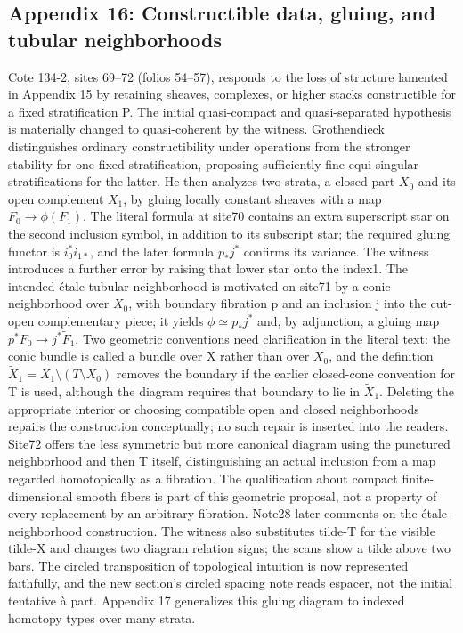\documentclass[10pt,oneside]{book}
\begin{document}
\subsection*{Appendix 16: Constructible data, gluing, and tubular neighborhoods}
Cote 134-2, sites 69--72 (folios 54--57), responds to the loss of structure lamented in Appendix 15 by retaining sheaves, complexes, or higher stacks constructible for a fixed stratification P. The initial quasi-compact and quasi-separated hypothesis is materially changed to quasi-coherent by the witness. Grothendieck distinguishes ordinary constructibility under operations from the stronger stability for one fixed stratification, proposing sufficiently fine equi-singular stratifications for the latter. He then analyzes two strata, a closed part $X_0$ and its open complement $X_1$, by gluing locally constant sheaves with a map $F_0\to\phi(F_1)$. The literal formula at site70 contains an extra superscript star on the second inclusion symbol, in addition to its subscript star; the required gluing functor is $i_0^*i_{1*}$, and the later formula $p_*j^*$ confirms its variance. The witness introduces a further error by raising that lower star onto the index1. The intended étale tubular neighborhood is motivated on site71 by a conic neighborhood over $X_0$, with boundary fibration p and an inclusion j into the cut-open complementary piece; it yields $\phi\simeq p_*j^*$ and, by adjunction, a gluing map $p^*F_0\to j^*\widetilde F_1$. Two geometric conventions need clarification in the literal text: the conic bundle is called a bundle over X rather than over $X_0$, and the definition $\widetilde X_1=X_1\setminus(T\setminus X_0)$ removes the boundary if the earlier closed-cone convention for T is used, although the diagram requires that boundary to lie in $\widetilde X_1$. Deleting the appropriate interior or choosing compatible open and closed neighborhoods repairs the construction conceptually; no such repair is inserted into the readers. Site72 offers the less symmetric but more canonical diagram using the punctured neighborhood and then T itself, distinguishing an actual inclusion from a map regarded homotopically as a fibration. The qualification about compact finite-dimensional smooth fibers is part of this geometric proposal, not a property of every replacement by an arbitrary fibration. Note28 later comments on the étale-neighborhood construction. The witness also substitutes tilde-T for the visible tilde-X and changes two diagram relation signs; the scans show a tilde above two bars. The circled transposition of topological intuition is now represented faithfully, and the new section's circled spacing note reads espacer, not the initial tentative à part. Appendix 17 generalizes this gluing diagram to indexed homotopy types over many strata.
\end{document}

